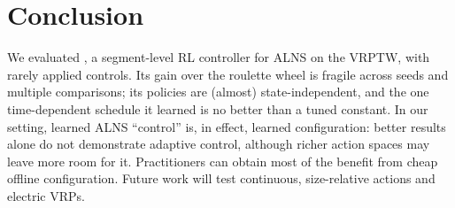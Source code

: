 \section{Conclusion}\label{sec:conclusion}
We evaluated \sgalns{}, a segment-level RL controller for ALNS on the VRPTW, with
rarely applied controls. Its gain over the roulette wheel is fragile across seeds and
multiple comparisons; its policies are (almost) state-independent, and the one
time-dependent schedule it learned is no better than a tuned constant. In our setting,
learned ALNS ``control'' is, in effect, learned configuration: better results alone do
not demonstrate adaptive control, although richer action spaces may leave more room for
it. Practitioners can obtain most of the benefit from cheap offline configuration.
Future work will test continuous, size-relative actions and electric VRPs.
